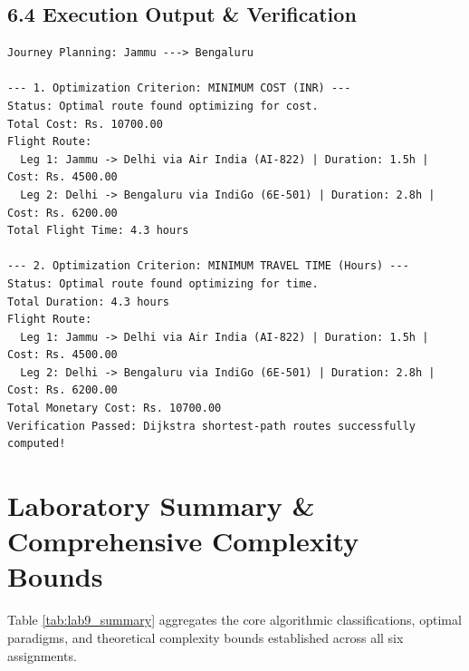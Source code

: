 \documentclass[12pt]{article}
\begin{document}
\subsection*{6.4 Execution Output \& Verification}
\begin{lstlisting}
Journey Planning: Jammu ---> Bengaluru

--- 1. Optimization Criterion: MINIMUM COST (INR) ---
Status: Optimal route found optimizing for cost.
Total Cost: Rs. 10700.00
Flight Route:
  Leg 1: Jammu -> Delhi via Air India (AI-822) | Duration: 1.5h | Cost: Rs. 4500.00
  Leg 2: Delhi -> Bengaluru via IndiGo (6E-501) | Duration: 2.8h | Cost: Rs. 6200.00
Total Flight Time: 4.3 hours

--- 2. Optimization Criterion: MINIMUM TRAVEL TIME (Hours) ---
Status: Optimal route found optimizing for time.
Total Duration: 4.3 hours
Flight Route:
  Leg 1: Jammu -> Delhi via Air India (AI-822) | Duration: 1.5h | Cost: Rs. 4500.00
  Leg 2: Delhi -> Bengaluru via IndiGo (6E-501) | Duration: 2.8h | Cost: Rs. 6200.00
Total Monetary Cost: Rs. 10700.00
Verification Passed: Dijkstra shortest-path routes successfully computed!
\end{lstlisting}

\newpage

\section*{Laboratory Summary \& Comprehensive Complexity Bounds}

Table \ref{tab:lab9_summary} aggregates the core algorithmic classifications, optimal paradigms, and theoretical complexity bounds established across all six assignments.
\end{document}
